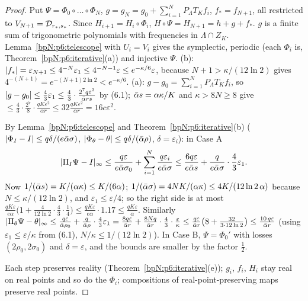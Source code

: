 \begin{proof}
\label{stepN:p6:nf-concl} Put $\Psi=\Phi_0\circ\dots\circ\Phi_N$, $g=g_N=g_0+\sum_{i=1}^NP_\Lambda T_Kf_i$, $f_*=f_{N+1}$, all restricted to $V_{N+1}=\mathcal D_{r_*,s_*}$. Since $H_{i+1}=H_i\circ\Phi_i$, $H\circ\Psi=H_{N+1}=h+g+f_*$. $g$ is a finite sum of trigonometric polynomials with frequencies in $\Lambda\cap Z_K$. Lemma~\ref{bpN:p6:telescope} with $U_i=V_i$ gives the symplectic, periodic (each $\Phi_i$ is, Theorem~\ref{bpN:p6:iterative}(a)) and injective $\Psi$.
(b): $\lvert f_*\rvert=\varepsilon_{N+1}\le4^{-N}\varepsilon_1\le4^{-N-1}\varepsilon\le e^{-\kappa/6}\varepsilon$, because $N+1>\kappa/(12\ln2)$ gives $4^{-(N+1)}=e^{-(N+1)2\ln2}<e^{-\kappa/6}$.
(a): $g-g_0=\sum_{i=1}^NP_\Lambda T_Kf_i$, so $\lvert g-g_0\rvert\le\frac43\varepsilon_1\le\frac43\cdot\frac{2^7q\varepsilon^2}{\bar\alpha rs}$ by (6.1); $\bar\alpha s=\alpha\kappa/K$ and $\kappa>8N\ge8$ give $\le\frac43\cdot\frac{2^7}{8}\cdot\frac{qK\varepsilon^2}{\alpha r}\le32\frac{qK\varepsilon^2}{\alpha r}=16c\varepsilon^2$.

\label{stepN:p6:nf-disp} By Lemma~\ref{bpN:p6:telescope} and Theorem~\ref{bpN:p6:iterative}(b) ($\lvert \Phi_I-I\rvert\le q\delta/(e\bar\alpha\sigma)$, $\lvert \Phi_\theta-\theta\rvert\le q\delta/(\bar\alpha\rho)$, $\delta=\varepsilon_i$): in Case A
\[\lvert \Pi_I\Psi-I\rvert_\infty\le\frac{q\varepsilon}{e\bar\alpha\sigma_0}+\sum_{i=1}^N\frac{q\varepsilon_i}{e\bar\alpha\sigma}\le\frac{6q\varepsilon}{e\bar\alpha s}+\frac{q}{e\bar\alpha\sigma}\cdot\frac43\varepsilon_1 .\]
Now $1/(\bar\alpha s)=K/(\alpha\kappa)\le K/(6\alpha)$; $1/(\bar\alpha\sigma)=4NK/(\alpha\kappa)\le4K/(12\ln2\,\alpha)$ because $N\le\kappa/(12\ln2)$, and $\varepsilon_1\le\varepsilon/4$; so the right side is at most $\frac{qK\varepsilon}{e\alpha}\bigl(1+\frac{4}{12\ln2}\cdot\frac43\cdot\frac14\bigr)\le\frac{qK\varepsilon}{e\alpha}\cdot1.17\le\frac{qK\varepsilon}\alpha$. Similarly $\lvert \Pi_\theta\Psi-\theta\rvert_\infty\le\frac{q\varepsilon}{\bar\alpha\rho_0}+\frac q{\bar\alpha\rho}\cdot\frac43\varepsilon_1=\frac{8q\varepsilon}{\bar\alpha r}+\frac{8Nq}{\bar\alpha r}\cdot\frac43\cdot\frac\varepsilon\kappa\le\frac{q\varepsilon}{\bar\alpha r}\bigl(8+\frac{32}{3\cdot12\ln2}\bigr)\le\frac{10\,q\varepsilon}{\bar\alpha r}$ (using $\varepsilon_1\le\varepsilon/\kappa$ from (6.1), $N/\kappa\le1/(12\ln2)$). In Case B, $\Psi=\Phi_0'$ with losses $(2\rho_0,2\sigma_0)$ and $\delta=\varepsilon$, and the bounds are smaller by the factor $\frac12$.

\label{stepN:p6:nf-real} Each step preserves reality (Theorem~\ref{bpN:p6:iterative}(e)); $g_i$, $f_i$, $H_i$ stay real on real points and so do the $\Phi_i$; compositions of real-point-preserving maps preserve real points.
\end{proof}

